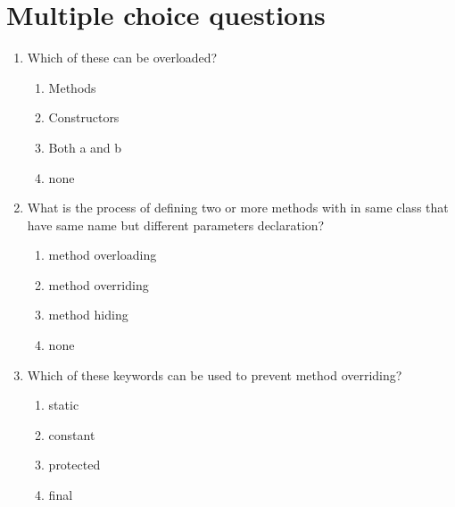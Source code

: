 \documentclass[11pt,a4paper]{article}
\begin{document}
\section*{Multiple choice questions}
\begin{enumerate}
\item Which of these can be overloaded?
\begin{enumerate}
\item Methods
\item Constructors
\item Both a and b
\item none
\end{enumerate}
\item What is the process of defining two or more methods with in same
class that have same name but different parameters declaration?
\begin{enumerate}
\item method overloading
\item method overriding
\item method hiding
\item none
\end{enumerate}
\item Which of these keywords can be used to prevent method overriding?
\begin{enumerate}
\item static
\item constant
\item protected
\item final
\end{enumerate}


\end{enumerate}
\end{document}
